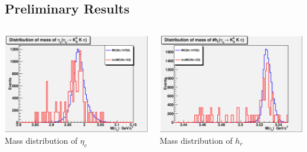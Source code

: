 \documentclass{beamer}
\begin{document}
\subsection{Preliminary Results}
\begin{frame}
\begin{columns}
\begin{column}{0.5\textwidth}
\begin{center}
\includegraphics[width=1\textwidth,angle=0]{figures/Pi0hc_invariant_mass_of_etac.eps}\\
Mass distribution of $\eta_c$
\end{center}
\end{column}
\begin{column}{0.5\textwidth}
\begin{center}
\includegraphics[width=1\textwidth,angle=0]{figures/Pi0hc_invariant_mass_of_hc.eps}\\
Mass distribution of $h_c$
\end{center}
\end{column}
\end{columns}
\end{frame}
\end{document}
